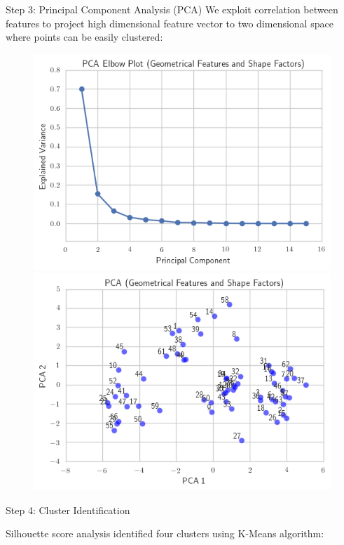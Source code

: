 \documentclass[final,hyperref={pdfpagelabels=false}]{beamer}
\begin{document}
\begin{frame}[t]
\begin{columns}[t]
\begin{column}{.465\textwidth}
\begin{block}{Step 3: Principal Component Analysis (PCA)}
We exploit correlation between features to project high dimensional feature vector to two dimensional space where points can be easily clustered:

\begin{figure}
\includegraphics[width=0.48\linewidth]{pca_fig1}
\hspace{0.5cm}
\includegraphics[width=0.48\linewidth]{pca_fig3}
\end{figure}

\end{block}


\begin{block}{Step 4: Cluster Identification}

Silhouette score analysis identified four clusters using K-Means algorithm:
\vspace{1em}


\end{block}
\end{column}
\end{columns}
\end{frame}
\end{document}
